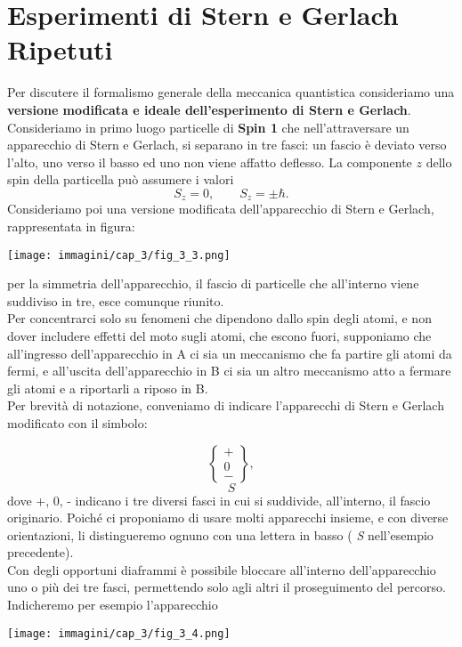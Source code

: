 \documentclass[a4paper,12pt,oneside]{book}
\begin{document}
\section{Esperimenti di Stern e Gerlach Ripetuti} 
Per discutere il formalismo generale della meccanica quantistica consideriamo una \textbf{versione modificata e ideale dell'esperimento di Stern e Gerlach}.\\
 
Consideriamo in primo luogo particelle di \textbf{Spin 1} che nell'attraversare un apparecchio di Stern e Gerlach, si separano in tre fasci: un fascio è deviato verso l'alto, uno verso il basso ed uno non viene affatto deflesso. La componente $z$ dello spin della particella può assumere i valori
	\begin{equation}
		S_z=0, \qquad S_z= \pm \hbar .
	\end{equation}
Consideriamo poi una versione modificata dell'apparecchio di Stern e Gerlach, rappresentata in figura: \\
\begin{center}
\texttt{[image: immagini/cap\_3/fig\_3\_3.png]}
\end{center}

per la simmetria dell'apparecchio, il fascio di particelle che all'interno viene suddiviso in tre, esce comunque riunito.\\

Per concentrarci solo su fenomeni che dipendono dallo spin degli atomi, e non  dover includere effetti del moto sugli atomi, che escono fuori, supponiamo che all'ingresso dell'apparecchio in A ci sia un meccanismo che fa partire gli atomi da fermi, e all'uscita dell'apparecchio in B ci sia un altro meccanismo atto a fermare gli atomi e a riportarli a riposo in B.\\
Per brevità  di notazione, conveniamo di indicare l'apparecchi di Stern e Gerlach modificato con il simbolo:

	\begin{equation}
		\begin{Bmatrix} + \\ 0 \\ -  \end{Bmatrix},
	\end{equation}
	\begin{equation*}
		S
	\end{equation*}
dove +, 0, - indicano i tre diversi fasci in cui si suddivide, all'interno, il fascio originario. Poiché ci proponiamo di usare molti apparecchi insieme, e con diverse orientazioni, li distingueremo ognuno con una lettera in basso ( \emph{S} nell'esempio precedente).\\ Con degli opportuni diaframmi è possibile bloccare all'interno dell'apparecchio uno o più dei tre fasci, permettendo solo agli altri il proseguimento del percorso. Indicheremo per esempio l'apparecchio \\
\begin{center}
\texttt{[image: immagini/cap\_3/fig\_3\_4.png]}
\end{center}
 
\end{document}
